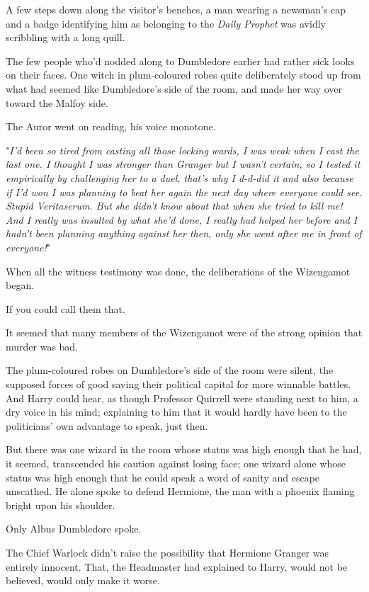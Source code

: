 A few steps down along the visitor’s benches, a man wearing a newsman’s cap and
a badge identifying him as belonging to the \emph{Daily Prophet} was avidly
scribbling with a long quill.

The few people who’d nodded along to Dumbledore earlier had rather sick looks
on their faces. One witch in plum-coloured robes quite deliberately stood up
from what had seemed like Dumbledore’s side of the room, and made her way over
toward the Malfoy side.

The Auror went on reading, his voice monotone.

"\emph{I’d been so tired from casting all those locking wards, I was weak when I
cast the last one. I thought I was stronger than Granger but I wasn’t certain,
so I tested it empirically by challenging her to a duel, that’s why I d-d-did
it and also because if I’d won I was planning to beat her again the next day
where everyone could see. Stupid Veritaserum. But \emph{she} didn’t know about
that when she tried to \emph{kill} me! And I really was insulted by what she’d
done, I really had helped her before and I hadn’t been planning anything
against her then, only \emph{she} went after \emph{me} in front of everyone!}"

When all the witness testimony was done, the deliberations of the Wizengamot
began.

If you could call them that.

It seemed that many members of the Wizengamot were of the strong opinion that
murder was bad.

The plum-coloured robes on Dumbledore’s side of the room were silent, the
supposed forces of good saving their political capital for more winnable
battles. And Harry could hear, as though Professor Quirrell were standing next
to him, a dry voice in his mind; explaining to him that it would hardly have
been to the politicians’ own advantage to speak, just then.

But there was one wizard in the room whose status was high enough that he had,
it seemed, transcended his caution against losing face; one wizard alone whose
status was high enough that he could speak a word of sanity and escape
unscathed. He alone spoke to defend Hermione, the man with a phoenix flaming
bright upon his shoulder.

Only Albus Dumbledore spoke.

The Chief Warlock didn’t raise the possibility that Hermione Granger was
entirely innocent. That, the Headmaster had explained to Harry, would not be
believed, would only make it worse.

